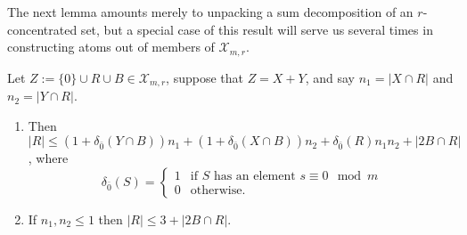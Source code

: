 The next lemma amounts merely to unpacking a sum decomposition of an $r$-concentrated set, but a special case of this result will serve us several times in constructing atoms out of members of $\mathcal{X}_{m,r}$.

\begin{lemma} \label{lem:both summands small}
Let $Z := \{0\}\cup R \cup B\in \mathcal{X}_{m,r}$, suppose that $Z = X + Y$, and say $n_1 = |X\cap R|$ and $n_2 = |Y\cap R|$.
\begin{enumerate}[label={\rm (\roman{*})}]
\item Then $|R| \le (1+\delta_{\bar{0}}(Y\cap B))n_1 + (1+\delta_{\bar{0}}(X\cap B))n_2 + \delta_{\bar{0}}(R)n_1n_2 + |2B \cap R|$,
where 
\[\delta_{\bar{0}}(S) = 
\begin{cases}
1& \textrm{if $S$ has an element $s \equiv 0 \mod m$} \\
0& \textrm{otherwise}.
\end{cases}\]
\item If $n_1,n_2 \le 1$ then $|R| \le 3 + |2B\cap R|$.
\end{enumerate}
\end{lemma}

